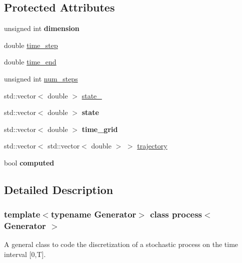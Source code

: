 \subsection*{Protected Attributes}
\begin{DoxyCompactItemize}
\item 
\mbox{\label{classprocess_ae6e8422beca0108090a599f2913146f4}} 
unsigned int {\bfseries dimension}
\item 
double \mbox{\hyperlink{classprocess_a058283b545a3ac9733136b6f48177586}{time\+\_\+step}}
\item 
double \mbox{\hyperlink{classprocess_aee60ec54e570201c8c115005aa0a4f30}{time\+\_\+end}}
\item 
unsigned int \mbox{\hyperlink{classprocess_a90acfc839d6d7465c4aa311bb6970788}{num\+\_\+steps}}
\item 
std\+::vector$<$ double $>$ \mbox{\hyperlink{classprocess_ab4d01c8ea2e9c8285134786d32ae42aa}{state\+\_}}
\item 
\mbox{\label{classprocess_a99c7e9db851147c1bb7142ac0ebb8761}} 
std\+::vector$<$ double $>$ {\bfseries state}
\item 
\mbox{\label{classprocess_ac2ac343c501e1a021c83347357730f03}} 
std\+::vector$<$ double $>$ {\bfseries time\+\_\+grid}
\item 
std\+::vector$<$ std\+::vector$<$ double $>$ $>$ \mbox{\hyperlink{classprocess_a63939362bca6b3ee7941c7219954719c}{trajectory}}
\item 
\mbox{\label{classprocess_a9cd553ee907233430f82f82496dfc909}} 
bool {\bfseries computed}
\end{DoxyCompactItemize}


\subsection{Detailed Description}
\subsubsection*{template$<$typename Generator$>$\newline
class process$<$ Generator $>$}

A general class to code the discretization of a stochastic process on the time interval \mbox{[}0,T\mbox{]}. 

